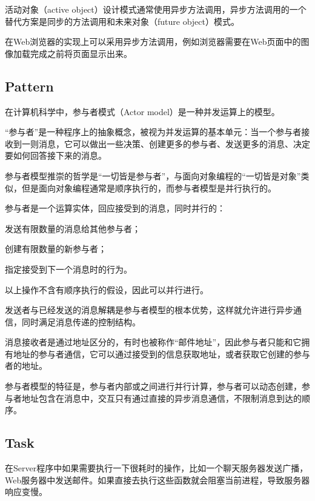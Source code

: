 活动对象（active object）设计模式通常使用异步方法调用，异步方法调用的一个替代方案是同步的方法调用和未来对象（future object）模式。



在Web浏览器的实现上可以采用异步方法调用，例如浏览器需要在Web页面中的图像加载完成之前将页面显示出来。


\subsection{Pattern}

在计算机科学中，参与者模式（Actor model）是一种并发运算上的模型。

“参与者”是一种程序上的抽象概念，被视为并发运算的基本单元：当一个参与者接收到一则消息，它可以做出一些决策、创建更多的参与者、发送更多的消息、决定要如何回答接下来的消息。

参与者模型推崇的哲学是“一切皆是参与者”，与面向对象编程的“一切皆是对象”类似，但是面向对象编程通常是顺序执行的，而参与者模型是并行执行的。

参与者是一个运算实体，回应接受到的消息，同时并行的：

\begin{compactitem}
\item 发送有限数量的消息给其他参与者；
\item 创建有限数量的新参与者；
\item 指定接受到下一个消息时的行为。
\end{compactitem}

以上操作不含有顺序执行的假设，因此可以并行进行。

发送者与已经发送的消息解耦是参与者模型的根本优势，这样就允许进行异步通信，同时满足消息传递的控制结构。

消息接收者是通过地址区分的，有时也被称作“邮件地址”，因此参与者只能和它拥有地址的参与者通信，它可以通过接受到的信息获取地址，或者获取它创建的参与者的地址。

参与者模型的特征是，参与者内部或之间进行并行计算，参与者可以动态创建，参与者地址包含在消息中，交互只有通过直接的异步消息通信，不限制消息到达的顺序。



\subsection{Task}



在Server程序中如果需要执行一下很耗时的操作，比如一个聊天服务器发送广播，Web服务器中发送邮件。如果直接去执行这些函数就会阻塞当前进程，导致服务器响应变慢。

